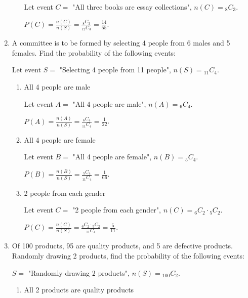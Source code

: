 \documentclass{report}
\newcommand\comb[2][^n]{{}_{#1}C_{#2}}
\begin{document}
\begin{multicols}{2}
\begin{enumerate}
\begin{enumerate}
                  Let event $C =$ "All three books are essay collections", $n(C) = \comb[8]{3}$.

                  $P(C) = \frac{n(C)}{n(S)} = \frac{\comb[8]{3}}{\comb[12]{3}} = \frac{14}{55}$.
          \end{enumerate}

    \item A committee is to be formed by selecting 4 people from 6 males and 5 females.
          Find the probability of the following events: \sol{}

          Let event $S =$ "Selecting 4 people from 11 people", $n(S) = \comb[11]{4}$.

          \begin{enumerate}
            \item All 4 people are male \sol{}

                  Let event $A =$ "All 4 people are male", $n(A) = \comb[6]{4}$.

                  $P(A) = \frac{n(A)}{n(S)} = \frac{\comb[6]{4}}{\comb[11]{4}} = \frac{1}{22}$.

            \item All 4 people are female \sol{}

                  Let event $B = $ "All 4 people are female", $n(B) = \comb[5]{4}$.

                  $P(B) = \frac{n(B)}{n(S)} = \frac{\comb[5]{4}}{\comb[11]{4}} = \frac{1}{66}$.

            \item 2 people from each gender
                  \sol{}

                  Let event $C =$ "2 people from each gender", $n(C) = \comb[6]{2} \cdot
                    \comb[5]{2}$.

                  $P(C) = \frac{n(C)}{n(S)} = \frac{\comb[6]{2} \cdot \comb[5]{2}}{\comb[11]{4}} = \frac{5}{11}$.
          \end{enumerate}

    \item Of 100 products, 95 are quality products, and 5 are defective products.
          Randomly drawing 2 products, find the probability of the following events:
          \sol{}

          $S =$ "Randomly drawing 2 products", $n(S) = \comb[100]{2}$.

          \begin{enumerate}
            \item All 2 products are quality products \sol{}


\end{enumerate}
\end{enumerate}
\end{multicols}
\end{document}

